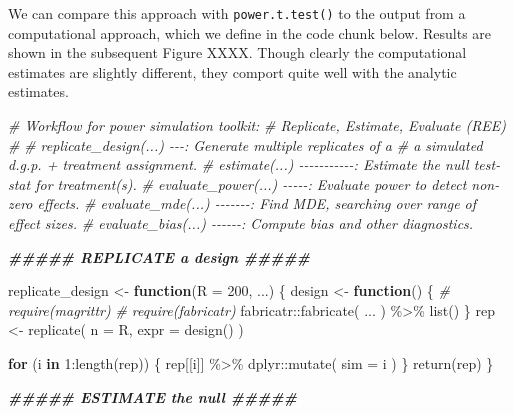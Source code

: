 \documentclass[
  12pt,
]{book}
\newenvironment{Shaded}{\begin{snugshade}}{\end{snugshade}}
\newcommand{\AttributeTok}[1]{\textcolor[rgb]{0.77,0.63,0.00}{#1}}
\newcommand{\CommentTok}[1]{\textcolor[rgb]{0.56,0.35,0.01}{\textit{#1}}}
\newcommand{\ControlFlowTok}[1]{\textcolor[rgb]{0.13,0.29,0.53}{\textbf{#1}}}
\newcommand{\DecValTok}[1]{\textcolor[rgb]{0.00,0.00,0.81}{#1}}
\newcommand{\DocumentationTok}[1]{\textcolor[rgb]{0.56,0.35,0.01}{\textbf{\textit{#1}}}}
\newcommand{\FunctionTok}[1]{\textcolor[rgb]{0.00,0.00,0.00}{#1}}
\newcommand{\NormalTok}[1]{#1}
\newcommand{\OtherTok}[1]{\textcolor[rgb]{0.56,0.35,0.01}{#1}}
\newcommand{\SpecialCharTok}[1]{\textcolor[rgb]{0.00,0.00,0.00}{#1}}
\theoremstyle{definition}
\theoremstyle{definition}
\theoremstyle{definition}
\theoremstyle{remark}
\begin{document}
We can compare this approach with \texttt{power.t.test()} to the output
from a computational approach, which we define in the code chunk below.
Results are shown in the subsequent Figure XXXX. Though clearly the
computational estimates are slightly different, they comport quite well
with the analytic estimates.

\begin{Shaded}
\begin{Highlighting}[]
\CommentTok{\# Workflow for power simulation toolkit:}
\CommentTok{\# Replicate, Estimate, Evaluate (REE)}
\CommentTok{\#}
\CommentTok{\# replicate\_design(...) {-}{-}{-}: Generate multiple replicates of a}
\CommentTok{\#                             a simulated d.g.p. + treatment assignment.}
\CommentTok{\# estimate(...) {-}{-}{-}{-}{-}{-}{-}{-}{-}{-}{-}: Estimate the null test{-}stat for treatment(s).}
\CommentTok{\# evaluate\_power(...) {-}{-}{-}{-}{-}: Evaluate power to detect non{-}zero effects.}
\CommentTok{\# evaluate\_mde(...) {-}{-}{-}{-}{-}{-}{-}: Find MDE, searching over range of effect sizes.}
\CommentTok{\# evaluate\_bias(...) {-}{-}{-}{-}{-}{-}: Compute bias and other diagnostics.}

\DocumentationTok{\#\#\#\#\# REPLICATE a design \#\#\#\#\#}

\NormalTok{replicate\_design }\OtherTok{\textless{}{-}}
  \ControlFlowTok{function}\NormalTok{(}\AttributeTok{R =} \DecValTok{200}\NormalTok{, ...) \{}
\NormalTok{    design }\OtherTok{\textless{}{-}} \ControlFlowTok{function}\NormalTok{() \{}
      \CommentTok{\# require(magrittr)}
      \CommentTok{\# require(fabricatr)}
\NormalTok{      fabricatr}\SpecialCharTok{::}\FunctionTok{fabricate}\NormalTok{(}
\NormalTok{        ...}
\NormalTok{      ) }\SpecialCharTok{\%\textgreater{}\%} \FunctionTok{list}\NormalTok{()}
\NormalTok{    \}}
\NormalTok{    rep }\OtherTok{\textless{}{-}} \FunctionTok{replicate}\NormalTok{(}
      \AttributeTok{n =}\NormalTok{ R,}
      \AttributeTok{expr =} \FunctionTok{design}\NormalTok{()}
\NormalTok{    )}

    \ControlFlowTok{for}\NormalTok{ (i }\ControlFlowTok{in} \DecValTok{1}\SpecialCharTok{:}\FunctionTok{length}\NormalTok{(rep)) \{}
\NormalTok{      rep[[i]] }\SpecialCharTok{\%\textgreater{}\%}
\NormalTok{        dplyr}\SpecialCharTok{::}\FunctionTok{mutate}\NormalTok{(}
          \AttributeTok{sim =}\NormalTok{ i}
\NormalTok{        )}
\NormalTok{    \}}
    \FunctionTok{return}\NormalTok{(rep)}
\NormalTok{  \}}

\DocumentationTok{\#\#\#\#\# ESTIMATE the null \#\#\#\#\#}


\end{Highlighting}
\end{Shaded}
\end{document}

